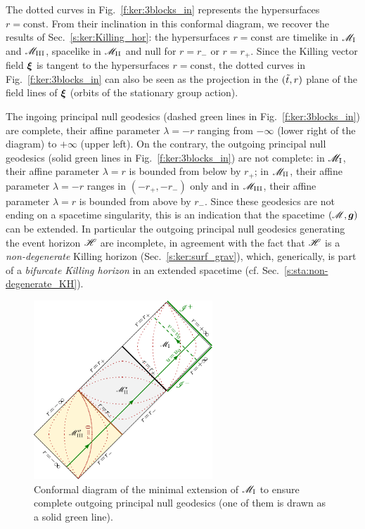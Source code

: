 The dotted curves in Fig.~\ref{f:ker:3blocks_in} represents the hypersurfaces
$r=\mathrm{const}$. From their inclination in this conformal diagram, we recover the results
of Sec.~\ref{s:ker:Killing_hor}: the hypersurfaces $r=\mathrm{const}$ are timelike in
$\mathscr{M}_{\rm I}$ and $\mathscr{M}_{\rm III}$, spacelike in $\mathscr{M}_{\rm II}$ and null for
$r=r_-$ or $r=r_+$. Since the Killing vector field $\bm{\xi}$ is tangent
to the hypersurfaces $r=\mathrm{const}$, the dotted curves in Fig.~\ref{f:ker:3blocks_in}
can also be seen as the projection in the $({\tilde t},r)$ plane of the field lines
of $\bm{\xi}$ (orbits of the stationary group action).

The ingoing principal null geodesics (dashed green lines in
Fig.~\ref{f:ker:3blocks_in}) are complete, their affine parameter $\lambda=-r$
ranging from $-\infty$ (lower right of the diagram) to $+\infty$ (upper left). On the contrary, the outgoing principal null geodesics (solid green lines in
Fig.~\ref{f:ker:3blocks_in}) are not complete: in $\mathscr{M}_{\rm I}$, their affine parameter
$\lambda=r$ is bounded from below by $r_+$; in $\mathscr{M}_{\rm II}$, their affine parameter
$\lambda=-r$ ranges in $(-r_+,-r_-)$ only and in $\mathscr{M}_{\rm III}$, their affine parameter
$\lambda=r$ is bounded from above by $r_-$. Since these geodesics are not ending on
a spacetime singularity, this is an indication that the spacetime $(\mathscr{M},\bm{g})$
can be extended. In particular the outgoing principal null geodesics
generating the event horizon $\mathscr{H}$ are incomplete, in agreement with the fact
that $\mathscr{H}$ is a \emph{non-degenerate} Killing horizon (Sec.~\ref{s:ker:surf_grav}),
which, generically, is part of a \emph{bifurcate Killing horizon}
in an extended spacetime (cf. Sec.~\ref{s:sta:non-degenerate_KH}).


\begin{figure}
\centerline{\includegraphics[width=0.6\textwidth]{ker_3blocks_out.pdf}}
\caption[]{\label{f:ker:3blocks_out} \footnotesize
Conformal diagram of the minimal extension of $\mathscr{M}_{\rm I}$ to ensure
complete outgoing principal null geodesics (one of them is drawn as a solid green line).}
\end{figure}


